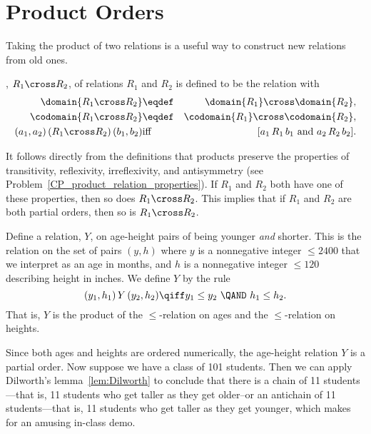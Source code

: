 \section{Product Orders}\label{prodsec}

Taking the product of two relations is a useful way to construct new
relations from old ones.

\begin{definition}\label{productrel}
, $R_1 \cross R_2$, of relations
$R_1$ and $R_2$ is defined to be the relation with
\begin{eqnarray*}
\domain{R_1 \cross R_2} &\eqdef& \domain{R_1} \cross \domain{R_2},\\
\codomain{R_1 \cross R_2} &\eqdef& \codomain{R_1} \cross \codomain{R_2},\\
(a_1,a_2)\, (R_1 \cross R_2)\, (b_1,b_2) &\text{iff}& [a_1\, R_1\, b_1
\text{ and } a_2\, R_2\, b_2].
\end{eqnarray*}

\end{definition}

It follows directly from the definitions that products preserve the
properties of transitivity, reflexivity, irreflexivity, and
antisymmetry (see Problem~\ref{CP_product_relation_properties}).  If
$R_1$ and $R_2$ both have one of these properties, then so does $R_1
\cross R_2$.  This implies that if $R_1$ and $R_2$ are both partial
orders, then so is $R_1 \cross R_2$.

\begin{example}\label{Y}
Define a relation, $Y$, on age-height pairs of being younger \emph{and}
shorter.  This is the relation on the set of pairs $(y,h)$ where $y$ is a
nonnegative integer $\le 2400$ that we interpret as an age in months, and $h$
is a nonnegative integer $\le 120$ describing height in inches.  We define $Y$
by the rule
\[
(y_1,h_1)\, Y\, (y_2,h_2) \qiff y_1 \le y_2\ \QAND\ h_1 \le h_2.
\]
That is, $Y$ is the product of the $\le$-relation on ages and the
$\le$-relation on heights.

Since both ages and heights are ordered numerically, the age-height
relation $Y$ is a partial order.  Now suppose we have a class of 101
students.  Then we can apply Dilworth's lemma~\ref{lem:Dilworth} to
conclude that there is a chain of 11 students---that is, 11 students who
get taller as they get older--or an antichain of 11 students---that
is, 11 students who get taller as they get younger, which makes for an
amusing in-class demo.
\end{example}

